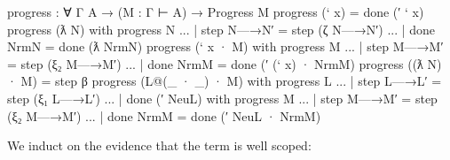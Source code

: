 \begin{fence}
\begin{code}
progress : ∀ {Γ A} → (M : Γ ⊢ A) → Progress M
progress (` x)                                 =  done (′ ` x)
progress (ƛ N)  with  progress N
... | step N—→N′                               =  step (ζ N—→N′)
... | done NrmN                                =  done (ƛ NrmN)
progress (` x · M) with progress M
... | step M—→M′                               =  step (ξ₂ M—→M′)
... | done NrmM                                =  done (′ (` x) · NrmM)
progress ((ƛ N) · M)                           =  step β
progress (L@(_ · _) · M) with progress L
... | step L—→L′                               =  step (ξ₁ L—→L′)
... | done (′ NeuL) with progress M
...    | step M—→M′                            =  step (ξ₂ M—→M′)
...    | done NrmM                             =  done (′ NeuL · NrmM)
\end{code}
\end{fence}

We induct on the evidence that the term is well scoped:

